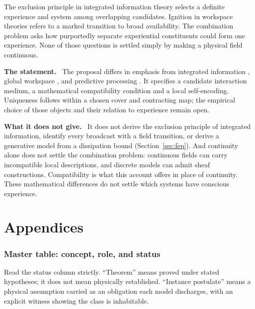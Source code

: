 \documentclass[11pt]{article}
\newcommand{\statement}{\par\smallskip\noindent\textbf{The statement.}\ }
\newcommand{\scope}{\par\smallskip\noindent\textbf{What it does not give.}\ }
\begin{document}
The exclusion principle in integrated information theory selects a definite
experience and system among overlapping candidates. Ignition in workspace
theories refers to a marked transition to broad availability. The combination
problem asks how purportedly separate experiential constituents could form one
experience. None of those questions is settled simply by making a physical
field continuous.

\statement
The proposal differs in emphasis from integrated information
\citep{tononi2016}, global workspace \citep{baars1997,dehaene2014}, and
predictive processing \citep{friston2010}. It specifies a candidate interaction
medium, a mathematical compatibility condition and a local self-encoding.
Uniqueness follows within a chosen cover and contracting map; the empirical
choice of those objects and their relation to experience remain open.

\scope
It does not derive the exclusion principle of integrated information, identify
every broadcast with a field transition, or derive a generative model from a
dissipation bound (Section~\ref{sec:fep}). And continuity alone does not settle
the combination problem: continuous fields can carry incompatible local
descriptions, and discrete models can admit sheaf constructions. Compatibility
is what this account offers in place of continuity. These mathematical
differences do not settle which systems have conscious experience.

\part*{Appendices}
\appendix
\section{Master table: concept, role, and status}

Read the status column strictly. ``Theorem'' means proved under stated
hypotheses; it does not mean physically established. ``Instance postulate''
means a physical assumption carried as an obligation each model discharges,
with an explicit witness showing the class is inhabitable.
\end{document}
